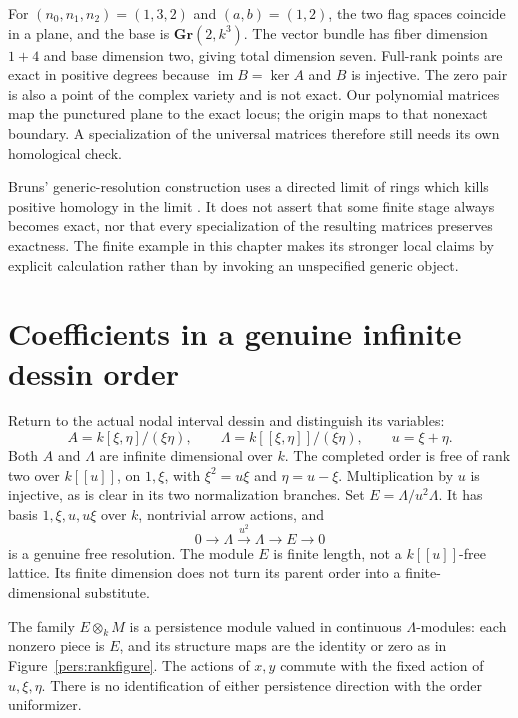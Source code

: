 \documentclass[11pt,oneside,openany]{book}
\theoremstyle{definition}\newtheorem{definition}[theorem]{Definition}
\theoremstyle{remark}\newtheorem{remark}[theorem]{Remark}
\begin{document}
For $(n_0,n_1,n_2)=(1,3,2)$ and $(a,b)=(1,2)$, the two flag spaces
coincide in a plane, and the base is $\mathbf{Gr}(2,k^3)$. The vector
bundle has fiber dimension $1+4$ and base dimension two, giving total
dimension seven. Full-rank points are exact in positive degrees because
$\operatorname{im}B=\ker A$ and $B$ is injective. The zero pair is also a
point of the complex variety and is not exact. Our polynomial matrices
map the punctured plane to the exact locus; the origin maps to that
nonexact boundary. A specialization of the universal matrices therefore
still needs its own homological check.

Bruns' generic-resolution construction uses a directed limit of rings
which kills positive homology in the limit \cite[Theorem 1, pp.35--36]{PersBruns}.
It does not assert that some finite stage always becomes exact, nor
that every specialization of the resulting matrices preserves exactness.
The finite example in this chapter makes its stronger local claims by
explicit calculation rather than by invoking an unspecified generic object.

\section{Coefficients in a genuine infinite dessin order}
Return to the actual nodal interval dessin and distinguish its variables:
\[
 A=k[\xi,\eta]/(\xi\eta),\qquad
 \Lambda=k[[\xi,\eta]]/(\xi\eta),\qquad u=\xi+\eta.
\]
Both $A$ and $\Lambda$ are infinite dimensional over $k$.
The completed order is free of rank two over $k[[u]]$, on $1,\xi$,
with $\xi^2=u\xi$ and $\eta=u-\xi$. Multiplication by $u$ is injective,
as is clear in its two normalization branches. Set $E=\Lambda/u^2\Lambda$.
It has basis $1,\xi,u,u\xi$ over $k$, nontrivial arrow actions, and
\[
 0\longrightarrow\Lambda\xrightarrow{u^2}\Lambda\longrightarrow E
       \longrightarrow0
\]
is a genuine free resolution. The module $E$ is finite length, not a
$k[[u]]$-free lattice. Its finite dimension does not turn its parent order
into a finite-dimensional substitute.

The family $E\otimes_k M$ is a persistence module valued in continuous
$\Lambda$-modules: each nonzero piece is $E$, and its structure maps are
the identity or zero as in Figure~\ref{pers:rankfigure}. The actions of
$x,y$ commute with the fixed action of $u,\xi,\eta$. There is no
identification of either persistence direction with the order uniformizer.
\end{document}
